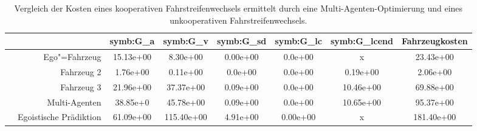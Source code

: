 \begin{table}[!htbp]
    \centering
    \begin{tabular}{crSSSSS|S}
        \hline
        & & \textbf{\gls{symb:G_a}} & \textbf{\gls{symb:G_v}} & \textbf{\gls{symb:G_sd}} & \textbf{\gls{symb:G_lc}} & \textbf{\gls{symb:G_lcend}} & {Fahrzeugkosten}\\%
        \hline
        & Ego"=Fahrzeug & 15.13e+00 & 8.30e+00 & 0.00e+00 & 0.0e+00 & x & 23.43e+00\\
        & Fahrzeug 2 & 1.76e+00 & 0.11e+00 & 0.0e+00 & 0.0e+00 & 0.19e+00 & 2.06e+00\\
        & Fahrzeug 3 & 21.96e+00 & 37.37e+00 & 0.09e+00 & 0.0e+00 & 10.46e+00 & 69.88e+00\\
        & Multi-Agenten & 38.85e+0 & 45.78e+00 & 0.09e+00 & 0.0e+00 & 10.65e+00 & 95.37e+00\\
        \hline
        &  Egoistische Pr\"adiktion& 61.09e+00 & 115.40e+00 & 4.91e+00 & 0.00e+00 & x & 181.40e+00\\
         \hline
    \end{tabular}
    \caption[Kostenvergleich]{Vergleich der Kosten eines kooperativen Fahrstreifenwechsels ermittelt durch eine Multi-Agenten-Optimierung und eines unkooperativen Fahrstreifenwechsels.
    }\label{tab:Kostenvergleich}
\end{table}




